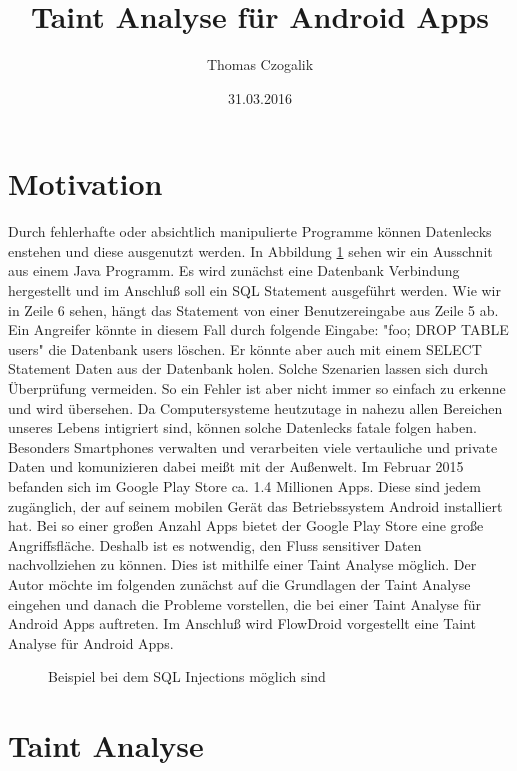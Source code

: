 \documentclass[runningheads]{llncs}
\begin{document}
\mainmatter
\title{Taint Analyse für Android Apps}
\author{Thomas Czogalik}
\date{31.03.2016}
\maketitle

\section{Motivation}
Durch fehlerhafte oder absichtlich manipulierte Programme können Datenlecks enstehen und diese ausgenutzt werden. 
In Abbildung \ref{fig:sql_code} sehen wir ein Ausschnit aus einem Java Programm. Es wird zunächst eine Datenbank Verbindung hergestellt und im Anschluß soll ein SQL Statement ausgeführt werden. Wie wir in Zeile 6 sehen, hängt das Statement von einer Benutzereingabe aus Zeile 5 ab. Ein Angreifer könnte in diesem Fall durch folgende Eingabe: "foo; DROP TABLE users" die Datenbank users löschen. Er könnte aber auch mit einem SELECT Statement Daten aus der Datenbank holen. Solche Szenarien lassen sich durch Überprüfung vermeiden. So ein Fehler ist aber nicht immer so einfach zu erkenne und wird übersehen. Da Computersysteme heutzutage in nahezu allen Bereichen unseres Lebens intigriert sind, können solche Datenlecks fatale folgen haben. Besonders Smartphones verwalten und verarbeiten viele vertauliche und private Daten und komunizieren dabei meißt mit der Außenwelt. Im Februar 2015 befanden sich im Google Play Store ca. 1.4 Millionen Apps. Diese sind jedem zugänglich, der auf seinem mobilen Gerät das Betriebssystem Android installiert hat. Bei so einer großen Anzahl Apps bietet der Google Play Store eine große Angriffsfläche. Deshalb ist es notwendig, den Fluss sensitiver Daten nachvollziehen zu können. Dies ist mithilfe einer Taint Analyse möglich.
Der Autor möchte im folgenden zunächst auf die Grundlagen der Taint Analyse eingehen und danach die Probleme vorstellen, die bei einer Taint Analyse für Android Apps auftreten. Im Anschluß wird FlowDroid vorgestellt eine Taint Analyse für Android Apps.

\begin{figure}

\caption{Beispiel bei dem SQL Injections möglich sind}
\label{fig:sql_code}
\end{figure}

\section{Taint Analyse}
\end{document}
